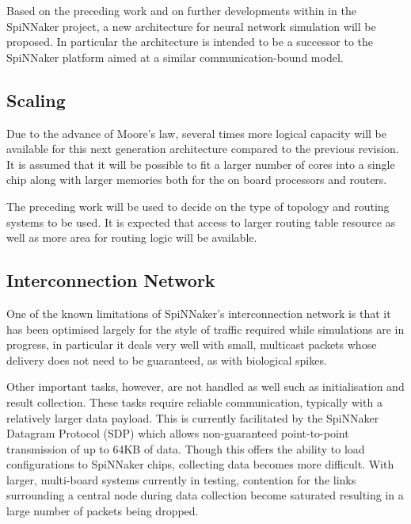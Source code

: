 		
		Based on the preceding work and on further developments within in the
		SpiNNaker project, a new architecture for neural network simulation will be
		proposed. In particular the architecture is intended to be a successor to
		the SpiNNaker platform aimed at a similar communication-bound model.
		
		\subsection{Scaling}
			
			Due to the advance of Moore's law, several times more logical capacity
			will be available for this next generation architecture compared to the
			previous revision. It is assumed that it will be possible to fit a larger
			number of cores into a single chip along with larger memories both for the
			on board processors and routers.
			
			The preceding work will be used to decide on the type of topology and
			routing systems to be used. It is expected that access to larger routing
			table resource as well as more area for routing logic will be available.
		
		\subsection{Interconnection Network}
			
			One of the known limitations of SpiNNaker's interconnection network is
			that it has been optimised largely for the style of traffic required while
			simulations are in progress, in particular it deals very well with small,
			multicast packets whose delivery does not need to be guaranteed, as with
			biological spikes.
			
			Other important tasks, however, are not handled as well such as
			initialisation and result collection. These tasks require reliable
			communication, typically with a relatively larger data payload. This is
			currently facilitated by the SpiNNaker Datagram Protocol (SDP)
			\cite{temple11} which allows non-guaranteed point-to-point transmission of
			up to 64KB of data. Though this offers the ability to load configurations
			to SpiNNaker chips, collecting data becomes more difficult.  With larger,
			multi-board systems currently in testing, contention for the links
			surrounding a central node during data collection become saturated
			resulting in a large number of packets being dropped.
		
